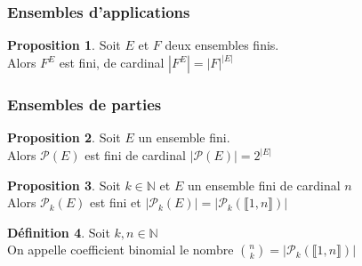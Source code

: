 \documentclass[10pt,a4paper]{article}
\theoremstyle{definition}
\newtheorem{proposition}{Proposition}[section]
\newtheorem{definition}[proposition]{Définition}
\begin{document}
\subsubsection{Ensembles d'applications}
\begin{proposition}
Soit $E$ et $F$ deux ensembles finis. \\
Alors $F^E$ est fini, de cardinal $|F^E| = \left|F\right|^{|E|}$
\end{proposition}

\subsubsection{Ensembles de parties}
\begin{proposition}
Soit $E$ un ensemble fini. \\
Alors $\mathcal{P}(E)$ est fini de cardinal $\left|\mathcal{P}(E)\right| = 2^{|E|}$
\end{proposition}
\begin{proposition}
Soit $k \in \mathbb{N}$ et $E$ un ensemble fini de cardinal $n$ \\
Alors $\mathcal{P}_k(E)$ est fini et $\left|\mathcal{P}_k(E)\right| = \left|\mathcal{P}_k(\llbracket 1, n \rrbracket)\right|$
\end{proposition}
\begin{definition}
Soit $k, n \in \mathbb{N}$ \\
On appelle coefficient binomial le nombre $\binom{n}{k} = \left|\mathcal{P}_k(\llbracket 1, n \rrbracket)\right|$
\end{definition}
\end{document}
